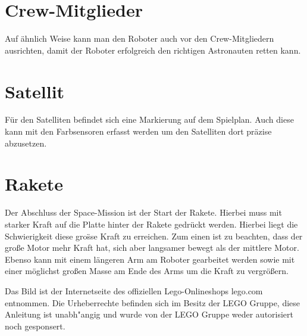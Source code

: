 \documentclass[
    DIV=calc,
    IMRAD=false,
	ngerman,
	accentcolor=1c,%
	marginpar=false,
	identbarcolor=1c,
	]{tudapub}
\begin{document}
\section{Crew-Mitglieder}
Auf \"ahnlich Weise kann man den Roboter auch vor den Crew-Mitgliedern ausrichten, damit der Roboter erfolgreich den richtigen Astronauten retten kann.

\section{Satellit}
F\"ur den Satelliten befindet sich eine Markierung auf dem Spielplan. Auch diese kann mit den Farbsensoren erfasst werden um den Satelliten dort pr\"azise abzusetzen.

\section{Rakete}
Der Abschluss der Space-Mission ist der Start der Rakete. Hierbei muss mit starker Kraft auf die Platte hinter der Rakete gedr\"uckt werden. Hierbei liegt die Schwierigkeit diese gro\"ss{}e Kraft zu erreichen. Zum einen ist zu beachten, dass der gro\ss{}e Motor mehr Kraft hat, sich aber langsamer bewegt als der mittlere Motor. Ebenso kann mit einem l\"angeren Arm am Roboter gearbeitet werden sowie mit einer m\"oglichst gro\ss{}en Masse am Ende des Arms um die Kraft zu vergr\"o\ss{}ern.

\bigskip \bigskip \bigskip

\tiny Das Bild ist der Internetseite des offiziellen Lego-Onlineshops lego.com entnommen. Die Urheberrechte befinden sich im Besitz der LEGO Gruppe, diese Anleitung ist unabh"angig und wurde von der LEGO Gruppe weder autorisiert noch gesponsert.
\cfoot{\textcolor{lightgray} \today}
\end{document}
